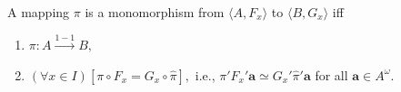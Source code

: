 A mapping $\pi$ is a monomorphism from $\langle A, F_x \rangle$ to $\langle B, G_x \rangle$ iff
\begin{enumerate}
\item $\pi: A \xrightarrow{1-1} B,$
\item $(\forall x \in I)[\pi \circ F_x = G_x \circ \hat{\pi}],$ i.e., $\pi'F_x'\mathbf{a} \simeq G_x'\hat{\pi}'\mathbf{a}$ for all $\mathbf{a} \in A^\omega$.
\end{enumerate}
